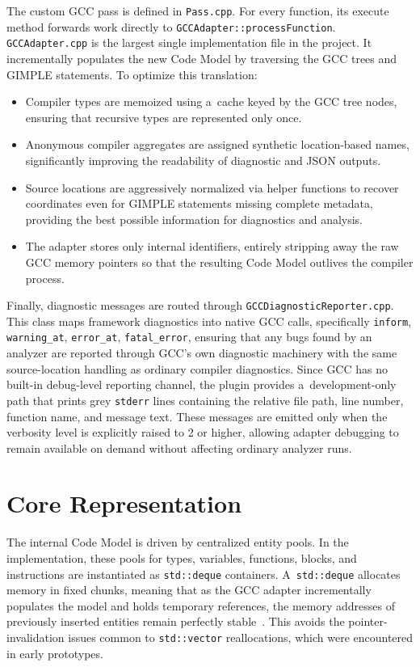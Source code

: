 \documentclass[xpsejal00-gcc-plugin.tex]{subfiles}
\begin{document}
The custom GCC pass is defined in \texttt{Pass.cpp}.
For every function, its execute method forwards work directly to \texttt{GCCAdapter::processFunction}.
\texttt{GCCAdapter.cpp} is the largest single implementation file in the project.
It incrementally populates the new Code Model by traversing the GCC trees and GIMPLE statements.
To optimize this translation:

\begin{itemize}
  \item Compiler types are memoized using a~cache keyed by the GCC tree nodes, ensuring that recursive types are represented only once.
  \item Anonymous compiler aggregates are assigned synthetic location-based names, significantly improving the readability of diagnostic and JSON outputs.
  \item Source locations are aggressively normalized via helper functions to recover coordinates even for GIMPLE statements missing complete metadata, providing the best possible information for diagnostics and analysis.
  \item The adapter stores only internal identifiers, entirely stripping away the raw GCC memory pointers so that the resulting Code Model outlives the compiler process.
\end{itemize}

Finally, diagnostic messages are routed through \texttt{GCCDiagnosticReporter.cpp}.
This class maps framework diagnostics into native GCC calls, specifically \texttt{inform}, \texttt{warning\_at}, \texttt{error\_at}, \texttt{fatal\_error}, ensuring that any bugs found by an analyzer are reported through GCC's own diagnostic machinery with the same source-location handling as ordinary compiler diagnostics.
Since GCC has no built-in debug-level reporting channel, the plugin provides a~development-only path that prints grey \texttt{stderr} lines containing the relative file path, line number, function name, and message text.
These messages are emitted only when the verbosity level is explicitly raised to 2 or higher, allowing adapter debugging to remain available on demand without affecting ordinary analyzer runs.

\section{Core Representation}\label{sec:core-representation}

The internal Code Model is driven by centralized entity pools.
In the implementation, these pools for types, variables, functions, blocks, and instructions are instantiated as \texttt{std::deque} containers.
A~\texttt{std::deque} allocates memory in fixed chunks, meaning that as the GCC adapter incrementally populates the model and holds temporary references, the memory addresses of previously inserted entities remain perfectly stable~\cite{EffectiveSTL}.
This avoids the pointer-invalidation issues common to \texttt{std::vector} reallocations, which were encountered in early prototypes.
\end{document}
